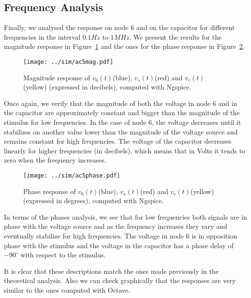 \subsection{Frequency Analysis} \label{subsec:freqanalysis}

Finally, we analysed the response on node 6 and on the capacitor for different frequencies in the interval $0.1Hz$ to $1MHz$. We present the results for the magnitude response in Figure~\ref{fig:simmag} and the ones for the phase response in Figure~\ref{fig:simphase}.

\begin{figure}[H] \centering
\texttt{[image: ../sim/ac5mag.pdf]}
\caption{Magnitude response of $v_6(t)$(blue), $v_s(t)$(red) and $v_c(t)$(yellow) (expressed in decibels), computed with Ngspice.}
\label{fig:simmag}
\end{figure}

Once again, we verify that the magnitude of both the voltage in node 6 and in the capacitor are approximately constant and bigger than the magnitude of the stimulus for low frequencies. In the case of node 6, the voltage decreases until it stabilizes on another value lower than the magnitude of the voltage source and remains constant for high frequencies. The voltage of the capacitor decreases linearly for higher frequencies (in decibels), which means that in Volts it tends to zero when the frequency increases.

\begin{figure}[H] \centering
\texttt{[image: ../sim/ac5phase.pdf]}
\caption{Phase response of $v_6(t)$(blue), $v_s(t)$(red) and $v_c(t)$(yellow) (expressed in degrees), computed with Ngspice.}
\label{fig:simphase}
\end{figure}

In terms of the phases analysis, we see that for low frequencies both signals are in phase with the voltage source and as the frequency increases they vary and eventually stabilize for high frequencies. The voltage in node 6 is in opposition phase with the stimulus and the voltage in the capacitor has a phase delay of $-90^{\circ}$ with respect to the stimulus.

It is clear that these descriptions match the ones made previously in the theoretical analysis. Also we can check graphically that the responses are very similar to the ones computed with Octave.



